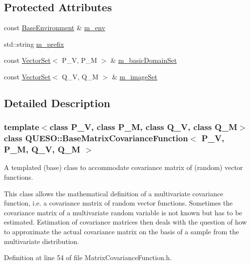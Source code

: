 \subsection*{Protected Attributes}
\begin{DoxyCompactItemize}
\item 
const \hyperlink{class_q_u_e_s_o_1_1_base_environment}{Base\-Environment} \& \hyperlink{class_q_u_e_s_o_1_1_base_matrix_covariance_function_a2bf98f6576db775109e240a2d828c578}{m\-\_\-env}
\item 
std\-::string \hyperlink{class_q_u_e_s_o_1_1_base_matrix_covariance_function_a05865387f77ce48e71ab2448982c5616}{m\-\_\-prefix}
\item 
const \hyperlink{class_q_u_e_s_o_1_1_vector_set}{Vector\-Set}$<$ P\-\_\-\-V, P\-\_\-\-M $>$ \& \hyperlink{class_q_u_e_s_o_1_1_base_matrix_covariance_function_a3c466742b27fc304cce106f96d8e49c7}{m\-\_\-basic\-Domain\-Set}
\item 
const \hyperlink{class_q_u_e_s_o_1_1_vector_set}{Vector\-Set}$<$ Q\-\_\-\-V, Q\-\_\-\-M $>$ \& \hyperlink{class_q_u_e_s_o_1_1_base_matrix_covariance_function_aa6e05a29048771a3a327b82cea09d480}{m\-\_\-image\-Set}
\end{DoxyCompactItemize}


\subsection{Detailed Description}
\subsubsection*{template$<$class P\-\_\-\-V, class P\-\_\-\-M, class Q\-\_\-\-V, class Q\-\_\-\-M$>$class Q\-U\-E\-S\-O\-::\-Base\-Matrix\-Covariance\-Function$<$ P\-\_\-\-V, P\-\_\-\-M, Q\-\_\-\-V, Q\-\_\-\-M $>$}

A templated (base) class to accommodate covariance matrix of (random) vector functions. 

This class allows the mathematical definition of a multivariate covariance function, i.\-e. a covariance matrix of random vector functions. Sometimes the covariance matrix of a multivariate random variable is not known but has to be estimated. Estimation of covariance matrices then deals with the question of how to approximate the actual covariance matrix on the basis of a sample from the multivariate distribution. 

Definition at line 54 of file Matrix\-Covariance\-Function.\-h.



